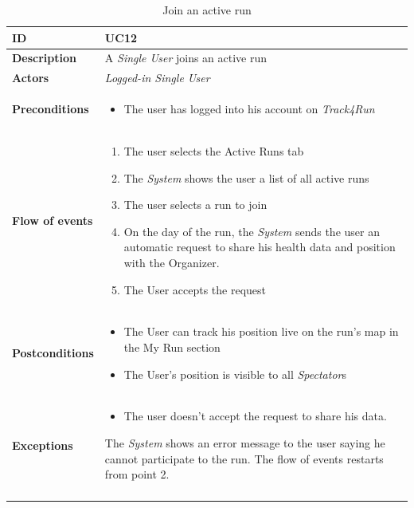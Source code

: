 \documentclass[titlepage]{article}
\begin{document}
 \begin{longtable}{| p{3 cm} | p{10 cm} |} 
			\hline
			{\bf ID} & UC12 \\
			\hline
			{\bf Description} & A {\it Single User} joins an active run  \\
			\hline
			{\bf Actors} & {\it Logged-in {\it Single User} }\\
			\hline
			{\bf Preconditions} & 		
							\begin{itemize}
								\item The user has logged into his account on {\it Track4Run}
							\end{itemize}
			\\
			\hline
			{\bf Flow of events} & 
							\begin{enumerate}
								\item The user selects the Active Runs tab
\item The {\it System} shows the user a list of all active runs 
\item The user selects a run to join
\item On the day of the run, the {\it System} sends the user an automatic request to share his health data and position with the Organizer.
\item The User accepts the request
							\end{enumerate}			
			 \\
			\hline
			{\bf Postconditions} & 
							\begin{itemize}
								\item The User can track his position live on the run’s map in the My Run section
\item The User’s position is visible to all {\it Spectator}s 
							\end{itemize}
			\\
			\hline
			{\bf Exceptions} & 
							\begin{itemize}
								\item The user doesn’t accept the request to share his data.
							\end{itemize}
							The {\it System} shows an error message to the user saying he cannot participate to the run. The flow of events restarts from point 2.						
			\\
			\hline
			\caption{Join an active run}
			\end{longtable}
\end{document}
